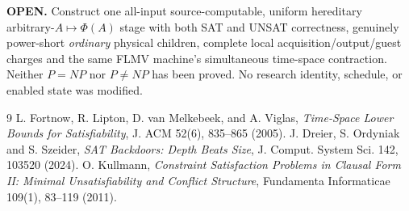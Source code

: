 \documentclass[11pt]{article}
\begin{document}
\noindent\textbf{OPEN.} Construct one all-input source-computable,
uniform hereditary arbitrary-$A\mapsto\Phi(A)$ stage with both
SAT and UNSAT correctness, genuinely power-short \emph{ordinary}
physical children, complete local acquisition/output/guest charges
and the same FLMV machine's simultaneous time-space contraction.
Neither $P=NP$ nor $P\ne NP$ has been proved.
No research identity, schedule, or enabled state was modified.

\begin{thebibliography}{9}
 L. Fortnow, R. Lipton, D. van Melkebeek, and A. Viglas,
\emph{Time-Space Lower Bounds for Satisfiability},
J. ACM 52(6), 835--865 (2005).
 J. Dreier, S. Ordyniak and S. Szeider,
\emph{SAT Backdoors: Depth Beats Size},
J. Comput. System Sci. 142, 103520 (2024).
 O. Kullmann,
\emph{Constraint Satisfaction Problems in Clausal Form II:
Minimal Unsatisfiability and Conflict Structure},
Fundamenta Informaticae 109(1), 83--119 (2011).
\end{thebibliography}
\end{document}
